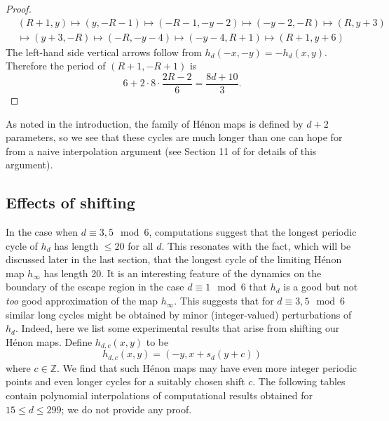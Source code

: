 \documentclass[12pt]{amsart}
\theoremstyle{definition}
\begin{document}
\begin{proof}
    \begin{align*}
        & (R+1,y) \mapsto (y,-R-1) \mapsto (-R-1,-y-2) \mapsto (-y-2,-R) \mapsto (R,y+3) \\
        & \mapsto (y+3,-R) \mapsto (-R,-y-4) \mapsto (-y-4,R+1) \mapsto (R+1,y+6)
    \end{align*}
    The left-hand side vertical arrows follow from  $h_d(-x,-y) = -h_d(x,y)$. Therefore the period of $(R+1,-R+1)$ is
    $$ 6 + 2\cdot 8\cdot \frac{2R-2}{6} = \frac{8d+10}{3}.$$
    \end{proof}

    As noted in the introduction, the family of H\'enon maps is defined by $d+2$ parameters, so we see that these cycles are much longer than one can hope for from a naive interpolation argument (see Section 11 of \cite{henon_openqs} for details of this argument).   



  \subsection{Effects of shifting}
    In the case when $d\equiv 3,5\mod 6$, computations suggest that the longest periodic cycle of $h_d$ has length $\leq 20$ for all $d$. This resonates with the fact, which will be discussed later in the last section, that the longest cycle of the limiting H\'enon map $h_{\infty}$ has length 20.  It is an interesting feature of the dynamics on the boundary of the escape region in the case $d \equiv 1 \mod 6$ that $h_d$ is a good but not \emph{too} good approximation of the map $h_{\infty}$. This suggests that for $d \equiv 3,5 \mod 6$ similar long cycles might be obtained by minor (integer-valued) perturbations of $h_d.$  Indeed, here we list some experimental results that arise from shifting our H\'enon maps.  Define $h_{d,c}(x,y)$ to be
$$ h_{d,c}(x,y) =(-y,x+s_d(y+c)) $$
where $c\in \mathbb{Z}$. We find that such H\'enon maps may have even more integer periodic points and even longer cycles for a suitably chosen shift $c$. The following tables contain polynomial interpolations of computational results obtained for $15\leq d\leq 299$; we do not provide any proof.
\end{document}
